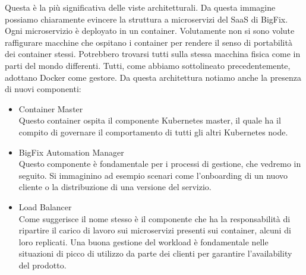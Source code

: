 Questa è la più significativa delle viste architetturali. Da questa immagine possiamo chiaramente evincere la struttura a microservizi del SaaS di BigFix. Ogni microservizio è deployato in un container. Volutamente non si sono volute raffigurare macchine che ospitano i container per rendere il senso di portabilità dei container stessi. Potrebbero trovarsi tutti sulla stessa macchina fisica come in parti del mondo differenti. Tutti, come abbiamo sottolineato precedentemente, adottano Docker come gestore. Da questa architettura notiamo anche la presenza di nuovi componenti:
\begin{itemize}
	\item Container Master \\
	Questo container ospita il componente Kubernetes master, il quale ha il compito di governare il comportamento di tutti gli altri Kubernetes node.
	\item BigFix Automation Manager \\
	Questo componente è fondamentale per i processi di gestione, che vedremo in seguito. Si immaginino ad esempio scenari come l'onboarding di un nuovo cliente o la distribuzione di una versione del servizio.
	\item Load Balancer \\
	Come suggerisce il nome stesso è il componente che ha la responsabilità di ripartire il carico di lavoro sui microservizi presenti sui container, alcuni di loro replicati. Una buona gestione del workload è fondamentale nelle situazioni di picco di utilizzo da parte dei clienti per garantire l'availability del prodotto.
\end{itemize}

